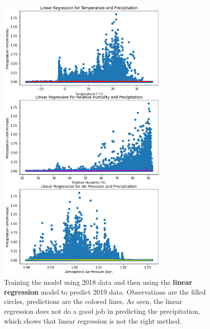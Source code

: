 \documentclass[11pt]{report}
\begin{document}
\begin{figure}[t]
  \centering
  \includegraphics[width=0.75\textwidth]{Figures/ML_Linear_reg.png}
  \caption[ML linear regression run] {\label{ML_Linear}Training the model
    using 2018 data and then using the \textbf{linear regression} model to
    predict 2019 data. Observations are the filled circles, predictions are
    the colored lines. As seen, the linear regression does not do a good job
    in predicting the precipitation, which shows that linear regression is
    not the right method. }
\end{figure}
\end{document}
